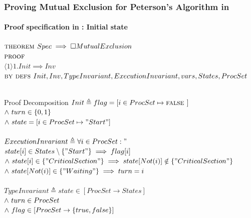 \documentclass[xcolor=dvipsnames]{beamer}
\begin{document}
\begin{frame}
	\frametitle{Proving Mutual Exclusion for Peterson's Algorithm in \tla}
	\framesubtitle{Proof specification in \tla : Initial state}
	
	\fontsize{8}{7.2}\selectfont
	$\textsc{theorem } Spec \implies \square MutualExclusion$\\
	$\textsc{proof }$\\
	\hspace*{0.8cm}$\langle1\rangle1. Init \implies Inv$\\
	\hspace*{1.2cm} $\textsc{by } \textsc{defs } Init, Inv, TypeInvariant, ExecutionInvariant, vars,States,ProcSet$\\~\\
	\begin{block}{Proof Decomposition}
		$ Init \triangleq flag = [i \in ProcSet \mapsto \mbox{\textsc{false }}]$ \\
		\hspace*{0.8cm}$\land \  turn \in \{0,1\}$\\
		\hspace*{0.8cm}$\land \   state =  [i \in ProcSet \mapsto "Start"]$\\~\\ 
		$ ExecutionInvariant \triangleq \forall i \in ProcSet:"$ \\
		\hspace*{0.8cm}$state[i] \in States \setminus  \{"Start"\} \implies flag[i] $\\
		\hspace*{0.8cm}$\land \   state[i] \in \{"CriticalSection"\} \implies state[Not(i)] \notin \{"CriticalSection"\}$\\
		\hspace*{0.8cm}$\land \  state[Not(i)] \in \{"Waiting"\} \implies turn = i$\\~\\
		$ TypeInvariant \triangleq state \in [ProcSet \rightarrow States]$ \\
		\hspace*{0.8cm}$\land \  turn \in ProcSet$\\
		\hspace*{0.8cm}$\land \  flag \in [ProcSet \rightarrow \{true, false\}]$
	\end{block}

\end{frame}
\end{document}

